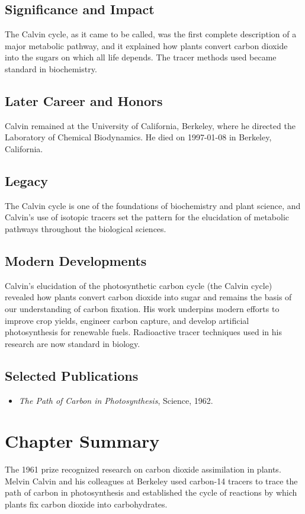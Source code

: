 \subsection*{Significance and Impact}

The Calvin cycle, as it came to be called, was the first complete description of a major metabolic pathway, and it explained how plants convert carbon dioxide into the sugars on which all life depends. The tracer methods used became standard in biochemistry.

\subsection*{Later Career and Honors}

Calvin remained at the University of California, Berkeley, where he directed the Laboratory of Chemical Biodynamics. He died on 1997-01-08 in Berkeley, California.

\subsection*{Legacy}

The Calvin cycle is one of the foundations of biochemistry and plant science, and Calvin's use of isotopic tracers set the pattern for the elucidation of metabolic pathways throughout the biological sciences.

\subsection*{Modern Developments}

Calvin's elucidation of the photosynthetic carbon cycle (the Calvin cycle) revealed how plants convert carbon dioxide into sugar and remains the basis of our understanding of carbon fixation. His work underpins modern efforts to improve crop yields, engineer carbon capture, and develop artificial photosynthesis for renewable fuels. Radioactive tracer techniques used in his research are now standard in biology.

\subsection*{Selected Publications}

\begin{itemize}

\item \emph{The Path of Carbon in Photosynthesis}, Science, 1962.

\end{itemize}

\clearpage

\section*{Chapter Summary}

The 1961 prize recognized research on carbon dioxide assimilation in plants. Melvin Calvin and his colleagues at Berkeley used carbon-14 tracers to trace the path of carbon in photosynthesis and established the cycle of reactions by which plants fix carbon dioxide into carbohydrates.

